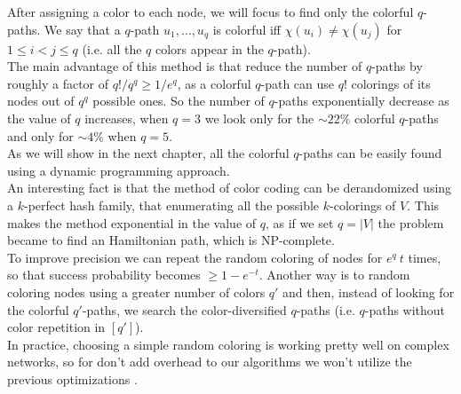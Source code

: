 After assigning a color to each node, we will focus to find only the colorful $q$-paths. We say that a $q$-path $u_{1}, \ldots, u_{q}$ is colorful iff $\chi(u_{i}) \neq \chi(u_{j})$ for $1 \leq i < j \leq q$ (i.e. all the $q$ colors appear in the $q$-path).\\

The main advantage of this method is that reduce the number of $q$-paths by roughly a factor of $q! / q^{q} \geq 1/e^{q}$, as a colorful $q$-path can use $q!$ colorings of its nodes out of $q^{q}$ possible ones. So the number of $q$-paths exponentially decrease as the value of $q$ increases, when $q = 3$ we look only for the $\sim22\%$ colorful $q$-paths and only for $\sim4\%$ when $q = 5$.\\

As we will show in the next chapter, all the colorful $q$-paths can be easily found using a dynamic programming approach.\\

An interesting fact is that the method of color coding can be derandomized using a $k$-perfect hash family\cite{Alon:1995:COL:210332.210337}, that enumerating all the possible $k$-colorings of $V$.
This makes the method exponential in the value of $q$, as if we set $q = |V|$ the problem became to find an Hamiltonian path, which is NP-complete\cite{GareyJohnson:1979}.\\

To improve precision we can repeat the random coloring of nodes for $e^{q}\ t$ times, 
so that success probability becomes $\geq 1-e^{-t}$. 
Another way is to random coloring nodes using a greater number of colors $q'$ and then, instead of looking for the colorful $q'$-paths,
we search the color-diversified $q$-paths (i.e. $q$-paths without color repetition in $[q']$)\cite{deshpande2007randomized}.\\

In practice, choosing a simple random coloring is working pretty well on complex networks, 
so for don't add overhead to our algorithms we won't utilize the previous optimizations .\\



